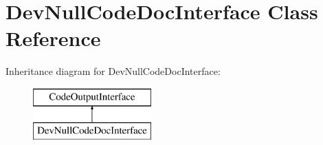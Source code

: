 \hypertarget{class_dev_null_code_doc_interface}{}\section{Dev\+Null\+Code\+Doc\+Interface Class Reference}
\label{class_dev_null_code_doc_interface}
Inheritance diagram for Dev\+Null\+Code\+Doc\+Interface\+:\begin{figure}[H]
\begin{center}
\leavevmode
\includegraphics[height=2.000000cm]{class_dev_null_code_doc_interface}
\end{center}
\end{figure}
